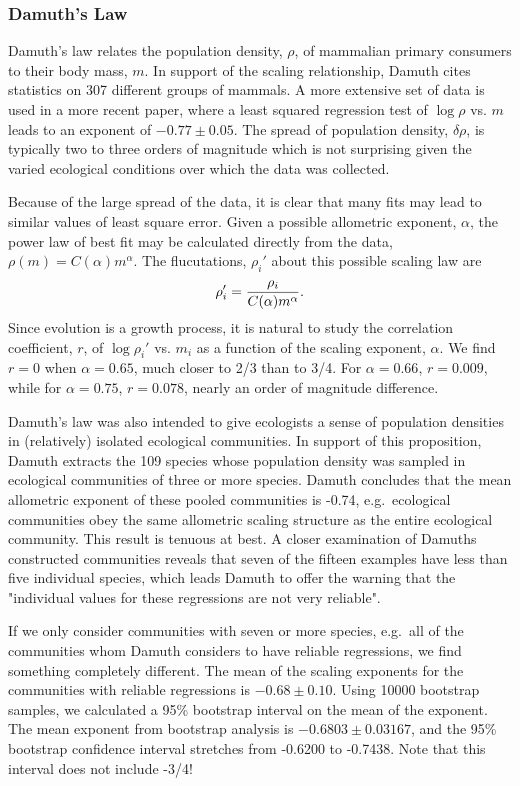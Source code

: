 \begin{frame}

  \frametitle{Damuth's Law}
  


Damuth's law relates the population density, $\rho$, of mammalian primary consumers
to their body mass, $m$.  In support of the scaling relationship,
Damuth cites statistics on 307 different groups of mammals\cite{damuth81}.  A more extensive
set of data is used in a more recent paper\cite{damuth93}, where a least squared
regression test of $\log\rho$ vs. $m$ leads to an exponent of $-0.77 \pm 0.05$.
The spread of population density, $\delta\rho$, is typically two to three orders of magnitude
which is not surprising given the varied ecological conditions over which the data was collected.

Because of the large spread of the data, it is clear that many fits
may lead to similar values of least square error.  Given a possible allometric exponent,
$\alpha$, the power law of best fit may be calculated directly from the data,
$\rho(m)=C(\alpha)m^{\alpha}$.  The flucutations, $\rho_i'$ about this possible scaling law are
\begin{equation}
\rho_i'={\rho_i\over C(\alpha)m^{\alpha}}.
\end{equation}
Since evolution is a growth process, it is natural to study the correlation coefficient, $r$,
of $\log\rho_i'$ vs. $m_i$ as a function of the scaling exponent, $\alpha$.  We find $r=0$ 
when $\alpha=0.65$, much closer to 2/3 than to 3/4.  For $\alpha=0.66$, $r=0.009$, while
for $\alpha=0.75$, $r=0.078$, nearly an order of magnitude difference.  

Damuth's law was also intended to give ecologists
a sense of population densities in (relatively) isolated
ecological communities.  In support of this proposition, Damuth extracts the
109 species whose population density was sampled in ecological communities
of three or more species.  Damuth concludes that the mean allometric exponent
of these pooled communities is -0.74, e.g.\ ecological communities obey the 
same allometric scaling structure as the entire ecological community.
This result is tenuous at best.  A closer examination of Damuths constructed communities
reveals that seven of the fifteen examples have less than five individual species,
which leads Damuth to offer the warning that the "individual values for
these regressions are not very reliable".

If we only consider communities with seven or more species, e.g.\ all
of the communities whom Damuth considers to have reliable regressions,
we find something completely different.  The mean of the scaling exponents for the 
communities with reliable regressions is $-0.68\pm 0.10$.
Using 10000 bootstrap samples, we calculated a 95\% bootstrap interval on the 
mean of the exponent.  
The mean exponent from bootstrap analysis is $-0.6803\pm 0.03167$, and the 95\% bootstrap confidence 
interval stretches from -0.6200 to -0.7438.  Note that this interval does not include -3/4!


\end{frame}
